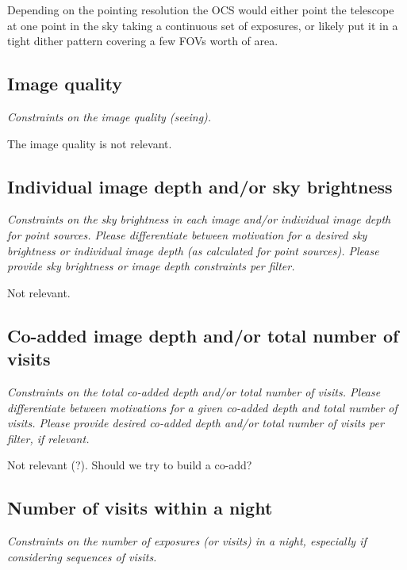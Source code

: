 \documentclass[12pt, letterpaper]{article}
\begin{document}
Depending on the pointing resolution the OCS would either point the
telescope at one point in the sky taking a continuous set of
exposures, or likely put it in a tight dither pattern covering a few
FOVs worth of area.

\subsection{Image quality}
\begin{footnotesize}{\it Constraints on the image quality (seeing).}\end{footnotesize}

The image quality is not relevant.

\subsection{Individual image depth and/or sky brightness}
\begin{footnotesize}{\it Constraints on the sky brightness in each image and/or individual image depth for point sources.
Please differentiate between motivation for a desired sky brightness or individual image depth (as 
calculated for point sources). Please provide sky brightness or image depth constraints per filter.}
\end{footnotesize}

Not relevant.

\subsection{Co-added image depth and/or total number of visits}
\begin{footnotesize}{\it  Constraints on the total co-added depth and/or total number of visits.
Please differentiate between motivations for a given co-added depth and total number of visits. 
Please provide desired co-added depth and/or total number of visits per filter, if relevant.}
\end{footnotesize}

Not relevant (?).  Should we try to build a co-add?

\subsection{Number of visits within a night}
\begin{footnotesize}{\it Constraints on the number of exposures (or visits) in a night, especially if considering sequences of visits.  }
\end{footnotesize}
\end{document}
